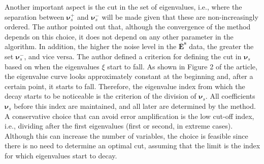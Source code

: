 			Another important aspect is the cut in the set of eigenvalues, i.e., where the separation between $\boldsymbol{\nu}^+_s$ and $\boldsymbol{\nu}^-_s$ will be made given that these are non-increasingly ordered. The author pointed out that, although the convergence of the method depends on this choice, it does not depend on any other parameter in the algorithm. In addition, the higher the noise level in the $\mathbf{\bar{E}^s}$ data, the greater the set $\boldsymbol{\nu}^-_s$, and vice versa. The author defined a criterion for defining the cut in $\boldsymbol{\nu}_s$ based on when the eigenvalues $\xi$ start to fall. As shown in Figure 2 of the article, the eigenvalue curve looks approximately constant at the beginning and, after a certain point, it starts to fall. Therefore, the eigenvalue index from which the decay starts to be noticeable is the criterion of the division of $\boldsymbol{\nu}_s$. All coefficients $\boldsymbol{\nu}_s$ before this index are maintained, and all later are determined by the method. A conservative choice that can avoid error amplification is the low cut-off index, i.e., dividing after the first eigenvalues (first or second, in extreme cases). Although this can increase the number of variables, the choice is feasible since there is no need to determine an optimal cut, assuming that the limit is the index for which eigenvalues start to decay.
			

